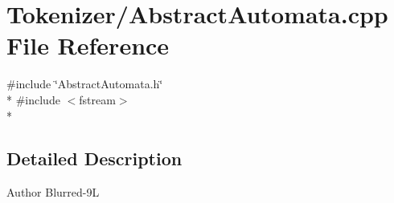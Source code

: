 \section{Tokenizer/\-Abstract\-Automata.cpp File Reference}
\label{_abstract_automata_8cpp}
{\ttfamily \#include \char`\"{}Abstract\-Automata.\-h\char`\"{}}\\*
{\ttfamily \#include $<$fstream$>$}\\*


\subsection{Detailed Description}
\begin{DoxyAuthor}{Author}
Blurred-\/9\-L 
\end{DoxyAuthor}
